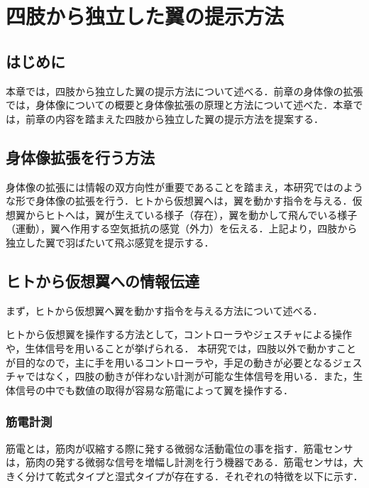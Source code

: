 \chapter[四肢から独立した翼の提示方法]%
        {四肢から独立した翼の提示方法}

\section{はじめに}
    本章では，四肢から独立した翼の提示方法について述べる．前章の身体像の拡張では，身体像についての概要と身体像拡張の原理と方法について述べた．本章では，前章の内容を踏まえた四肢から独立した翼の提示方法を提案する．


\section{身体像拡張を行う方法}
    身体像の拡張には情報の双方向性が重要であることを踏まえ，本研究ではのような形で身体像の拡張を行う．ヒトから仮想翼へは，翼を動かす指令を与える．仮想翼からヒトへは，翼が生えている様子（存在），翼を動かして飛んでいる様子（運動），翼へ作用する空気抵抗の感覚（外力）を伝える．上記より，四肢から独立した翼で羽ばたいて飛ぶ感覚を提示する．
    
\section{ヒトから仮想翼への情報伝達}
    まず，ヒトから仮想翼へ翼を動かす指令を与える方法について述べる．

    ヒトから仮想翼を操作する方法として，コントローラやジェスチャによる操作や，生体信号を用いることが挙げられる．
    本研究では，四肢以外で動かすことが目的なので，主に手を用いるコントローラや，手足の動きが必要となるジェスチャではなく，四肢の動きが伴わない計測が可能な生体信号を用いる．また，生体信号の中でも数値の取得が容易な筋電によって翼を操作する．
    
    \subsection{筋電計測}
        筋電とは，筋肉が収縮する際に発する微弱な活動電位の事を指す．筋電センサは，筋肉の発する微弱な信号を増幅し計測を行う機器である\cite{alts-myography}．筋電センサは，大きく分けて乾式タイプと湿式タイプが存在する．それぞれの特徴を以下に示す．

